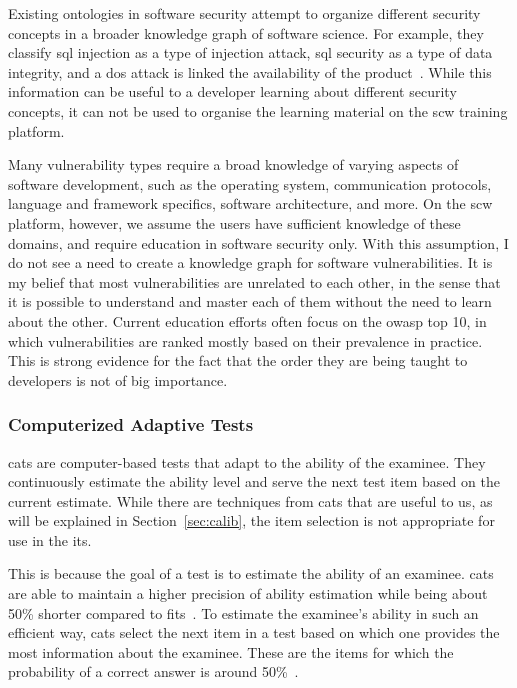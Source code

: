 Existing ontologies in software security attempt to organize different security concepts in a broader knowledge graph of software science.
For example, they classify \gls{sql} injection as a type of injection attack, \gls{sql} security as a type of data integrity, and a \gls{dos} attack is linked the availability of the product~\cite{kang2013security, jia2018practical}.
While this information can be useful to a developer learning about different security concepts, it can not be used to organise the learning material on the \gls{scw} training platform.

Many vulnerability types require a broad knowledge of varying aspects of software development, such as the operating system, communication protocols, language and framework specifics, software architecture, and more.
On the \gls{scw} platform, however, we assume the users have sufficient knowledge of these domains, and require education in software security only.
With this assumption, I do not see a need to create a knowledge graph for software vulnerabilities.
It is my belief that most vulnerabilities are unrelated to each other, in the sense that it is possible to understand and master each of them without the need to learn about the other.
Current education efforts often focus on the \gls{owasp} top 10, in which vulnerabilities are ranked mostly based on their prevalence in practice.
This is strong evidence for the fact that the order they are being taught to developers is not of big importance.

\subsubsection{Computerized Adaptive Tests}
\Glspl{cat} are computer-based tests that adapt to the ability of the examinee. 
They continuously estimate the ability level and serve the next test item based on the current estimate.
While there are techniques from \glspl{cat} that are useful to us, as will be explained in Section~\ref{sec:calib}, the item selection is not appropriate for use in the \gls{its}.

This is because the goal of a test is to estimate the ability of an examinee. \Glspl{cat} are able to maintain a higher precision of ability estimation while being about 50\% shorter compared to \glspl{fit}~\cite{weiss1984application}.
To estimate the examinee's ability in such an efficient way, \glspl{cat} select the next item in a test based on which one provides the most information about the examinee. 
These are the items for which the probability of a correct answer is around 50\%~\cite{magis2017computerized, ling2017computerized}.

